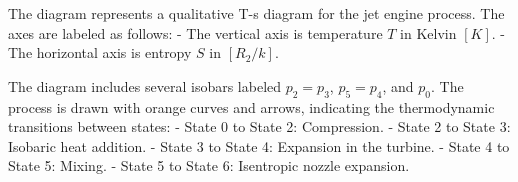 The diagram represents a qualitative T-s diagram for the jet engine process. The axes are labeled as follows:  
- The vertical axis is temperature \( T \) in Kelvin \([K]\).  
- The horizontal axis is entropy \( S \) in \([R_2/k]\).  

The diagram includes several isobars labeled \( p_2 = p_3 \), \( p_5 = p_4 \), and \( p_0 \). The process is drawn with orange curves and arrows, indicating the thermodynamic transitions between states:  
- State 0 to State 2: Compression.  
- State 2 to State 3: Isobaric heat addition.  
- State 3 to State 4: Expansion in the turbine.  
- State 4 to State 5: Mixing.  
- State 5 to State 6: Isentropic nozzle expansion.